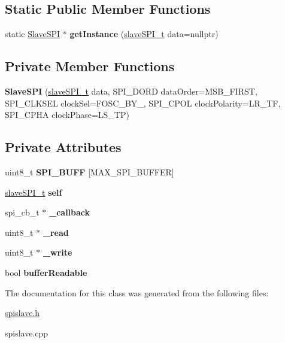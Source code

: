 \subsection*{Static Public Member Functions}
\begin{DoxyCompactItemize}
\item 
\mbox{\label{classSlaveSPI_af853e49df2daa8df562c211d4c01c825}} 
static \hyperlink{classSlaveSPI}{Slave\+S\+PI} $\ast$ {\bfseries get\+Instance} (\hyperlink{structslaveSPI__t}{slave\+S\+P\+I\+\_\+t} data=nullptr)
\end{DoxyCompactItemize}
\subsection*{Private Member Functions}
\begin{DoxyCompactItemize}
\item 
\mbox{\label{classSlaveSPI_a4e4d482325a3cdd0f626130ba351c402}} 
{\bfseries Slave\+S\+PI} (\hyperlink{structslaveSPI__t}{slave\+S\+P\+I\+\_\+t} data, S\+P\+I\+\_\+\+D\+O\+RD data\+Order=M\+S\+B\+\_\+\+F\+I\+R\+ST, S\+P\+I\+\_\+\+C\+L\+K\+S\+EL clock\+Sel=F\+O\+S\+C\+\_\+\+B\+Y\+\_, S\+P\+I\+\_\+\+C\+P\+OL clock\+Polarity=L\+R\+\_\+\+TF, S\+P\+I\+\_\+\+C\+P\+HA clock\+Phase=L\+S\+\_\+\+TP)
\end{DoxyCompactItemize}
\subsection*{Private Attributes}
\begin{DoxyCompactItemize}
\item 
\mbox{\label{classSlaveSPI_a6a33cdba141195a5a8157aed8dd39527}} 
uint8\+\_\+t {\bfseries S\+P\+I\+\_\+\+B\+U\+FF} \mbox{[}M\+A\+X\+\_\+\+S\+P\+I\+\_\+\+B\+U\+F\+F\+ER\mbox{]}
\item 
\mbox{\label{classSlaveSPI_a4c6a1758bdfcc6b7987aa8aaade47e57}} 
\hyperlink{structslaveSPI__t}{slave\+S\+P\+I\+\_\+t} {\bfseries self}
\item 
\mbox{\label{classSlaveSPI_adaf64cc08db2c73c7304d1ab9e6ef7c4}} 
spi\+\_\+cb\+\_\+t $\ast$ {\bfseries \+\_\+callback}
\item 
\mbox{\label{classSlaveSPI_ad9cf150323ece7a6f842d678b2aa1b79}} 
uint8\+\_\+t $\ast$ {\bfseries \+\_\+read}
\item 
\mbox{\label{classSlaveSPI_a7ce2f27aafe7c97bf92426aa79d7c4cf}} 
uint8\+\_\+t $\ast$ {\bfseries \+\_\+write}
\item 
\mbox{\label{classSlaveSPI_ab4d9e7eebaaead1f8dde9f933bfec2f1}} 
bool {\bfseries buffer\+Readable}
\end{DoxyCompactItemize}


The documentation for this class was generated from the following files\+:\begin{DoxyCompactItemize}
\item 
\hyperlink{spislave_8h}{spislave.\+h}\item 
spislave.\+cpp\end{DoxyCompactItemize}
